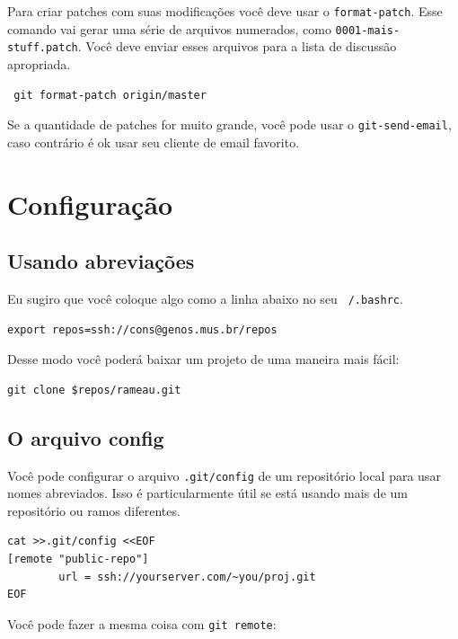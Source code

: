 \documentclass[12pt,brazil]{book}
\begin{document}
Para criar patches com suas modificações você deve usar o
\texttt{format-patch}. Esse comando vai gerar uma série de arquivos
numerados, como \texttt{0001-mais-stuff.patch}. Você deve enviar esses
arquivos para a lista de discussão apropriada.

\begin{verbatim}
 git format-patch origin/master
\end{verbatim}

Se a quantidade de patches for muito grande, você pode usar o
\texttt{git-send-email}, caso contrário é ok usar seu cliente de email
favorito.

\section{Configuração}
\label{sec:configuracao}

\subsection{Usando abreviações}
\label{sec:usando-abreviacoes}

Eu sugiro que você coloque algo como a linha abaixo no seu
\texttt{~/.bashrc}.

\begin{verbatim}
export repos=ssh://cons@genos.mus.br/repos
\end{verbatim}

Desse modo você poderá baixar um projeto de uma maneira mais fácil:

\begin{verbatim}
git clone $repos/rameau.git
\end{verbatim}

\subsection{O arquivo config}
\label{sec:o-arquivo-config}

Você pode configurar o arquivo \texttt{.git/config} de um repositório
local para usar nomes abreviados. Isso é particularmente útil se está
usando mais de um repositório ou ramos diferentes.

\begin{verbatim}
cat >>.git/config <<EOF
[remote "public-repo"]
        url = ssh://yourserver.com/~you/proj.git
EOF
\end{verbatim}

Você pode fazer a mesma coisa com \texttt{git remote}:
\end{document}
